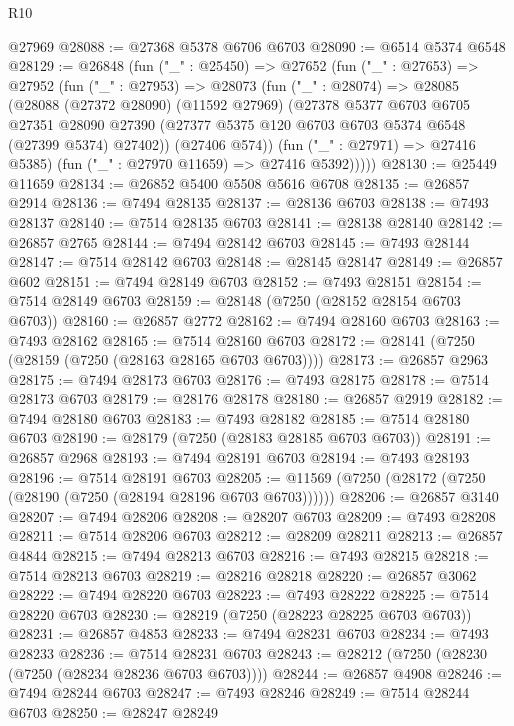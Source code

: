\begin{lexlean}{R10}
\begin{coremodule}
    @27969
@28088 := @27368 @5378 @6706 @6703
@28090 := @6514 @5374 @6548
@28129 := @26848
    (fun ("_" : @25450) =>
    @27652
      (fun ("_" : @27653) =>
      @27952
        (fun ("_" : @27953) =>
        @28073
          (fun ("_" : @28074) =>
          @28085
            (@28088
              (@27372 @28090)
              (@11592 @27969)
              (@27378
                @5377
                @6703
                @6705
                @27351
                @28090
                @27390
                (@27377 @5375 @120 @6703 @6703 @5374 @6548 (@27399 @5374) @27402))
              (@27406 @574))
            (fun ("_" : @27971) => @27416 @5385)
            (fun ("_" : @27970 @11659) => @27416 @5392)))))
@28130 := @25449 @11659
@28134 := @26852 @5400 @5508 @5616 @6708
@28135 := @26857 @2914
@28136 := @7494 @28135
@28137 := @28136 @6703
@28138 := @7493 @28137
@28140 := @7514 @28135 @6703
@28141 := @28138 @28140
@28142 := @26857 @2765
@28144 := @7494 @28142 @6703
@28145 := @7493 @28144
@28147 := @7514 @28142 @6703
@28148 := @28145 @28147
@28149 := @26857 @602
@28151 := @7494 @28149 @6703
@28152 := @7493 @28151
@28154 := @7514 @28149 @6703
@28159 := @28148 (@7250 (@28152 @28154 @6703 @6703))
@28160 := @26857 @2772
@28162 := @7494 @28160 @6703
@28163 := @7493 @28162
@28165 := @7514 @28160 @6703
@28172 := @28141 (@7250 (@28159 (@7250 (@28163 @28165 @6703 @6703))))
@28173 := @26857 @2963
@28175 := @7494 @28173 @6703
@28176 := @7493 @28175
@28178 := @7514 @28173 @6703
@28179 := @28176 @28178
@28180 := @26857 @2919
@28182 := @7494 @28180 @6703
@28183 := @7493 @28182
@28185 := @7514 @28180 @6703
@28190 := @28179 (@7250 (@28183 @28185 @6703 @6703))
@28191 := @26857 @2968
@28193 := @7494 @28191 @6703
@28194 := @7493 @28193
@28196 := @7514 @28191 @6703
@28205 := @11569 (@7250 (@28172 (@7250 (@28190 (@7250 (@28194 @28196 @6703 @6703))))))
@28206 := @26857 @3140
@28207 := @7494 @28206
@28208 := @28207 @6703
@28209 := @7493 @28208
@28211 := @7514 @28206 @6703
@28212 := @28209 @28211
@28213 := @26857 @4844
@28215 := @7494 @28213 @6703
@28216 := @7493 @28215
@28218 := @7514 @28213 @6703
@28219 := @28216 @28218
@28220 := @26857 @3062
@28222 := @7494 @28220 @6703
@28223 := @7493 @28222
@28225 := @7514 @28220 @6703
@28230 := @28219 (@7250 (@28223 @28225 @6703 @6703))
@28231 := @26857 @4853
@28233 := @7494 @28231 @6703
@28234 := @7493 @28233
@28236 := @7514 @28231 @6703
@28243 := @28212 (@7250 (@28230 (@7250 (@28234 @28236 @6703 @6703))))
@28244 := @26857 @4908
@28246 := @7494 @28244 @6703
@28247 := @7493 @28246
@28249 := @7514 @28244 @6703
@28250 := @28247 @28249

\end{coremodule}
\end{lexlean}
